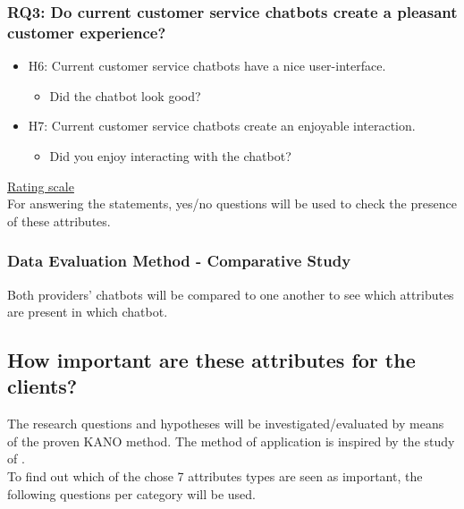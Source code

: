 \subsubsection{RQ3: Do current customer service chatbots create a pleasant customer experience?}
\begin{itemize}
	\item H6: Current customer service chatbots have a nice user-interface.
	\begin{itemize}
		\item Did the chatbot look good?
	\end{itemize}
	\item H7: Current customer service chatbots create an enjoyable interaction.
	\begin{itemize}
		\item Did you enjoy interacting with the chatbot?
	\end{itemize}
\end{itemize}
\ul{Rating scale}\\
For answering the statements, yes/no questions will be used to check the presence of these attributes.\\

\subsubsection{Data Evaluation Method - Comparative Study}
Both providers’ chatbots will be compared to one another to see which attributes are present in which chatbot.\\

\subsection{How important are these attributes for the clients?}
The research questions and hypotheses will be investigated/evaluated by means of the proven KANO method. The method of application is inspired by the study of \citep{Verkeyn2018}.\\
\break
To find out which of the chose 7 attributes types are seen as important, the following questions per category will be used.

